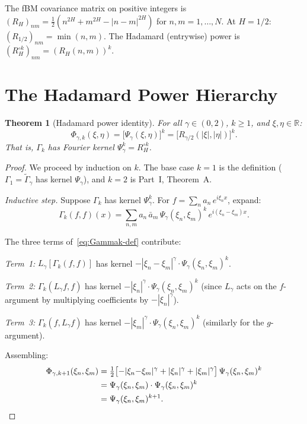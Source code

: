 \documentclass[11pt,a4paper]{article}
\theoremstyle{plain}
\newtheorem{theorem}{Theorem}[section]
\theoremstyle{definition}
\theoremstyle{remark}
\newcommand{\R}{\mathbb{R}}
\begin{document}
The fBM covariance matrix on positive integers is
$(R_H)_{nm} = \frac{1}{2}(n^{2H} + m^{2H} - |n-m|^{2H})$
for $n,m = 1,\ldots,N$.
At $H = 1/2$: $(R_{1/2})_{nm} = \min(n,m)$.
The Hadamard (entrywise) power is
$(R_H^{\circ k})_{nm} = (R_H(n,m))^k$.


\section{The Hadamard Power Hierarchy}\label{sec:hierarchy}

\begin{theorem}[Hadamard power identity]\label{thm:hierarchy}
For all $\gamma \in (0,2)$, $k \geq 1$, and $\xi,\eta \in \R$:
\begin{equation}\label{eq:Phik-formula}
  \Phi_{\gamma,k}(\xi,\eta) = \bigl[\Psi_\gamma(\xi,\eta)\bigr]^k
  = \bigl[R_{\gamma/2}(|\xi|,|\eta|)\bigr]^k.
\end{equation}
That is, $\Gamma_k$ has Fourier kernel $\Psi_\gamma^k = R_H^{\circ k}$.
\end{theorem}

\begin{proof}
We proceed by induction on $k$. The base case $k = 1$ is the
definition ($\Gamma_1 = \widetilde{\Gamma}_\gamma$ has kernel
$\Psi_\gamma$), and $k = 2$ is Part~I, Theorem~A.

\emph{Inductive step.}
Suppose $\Gamma_k$ has kernel $\Psi_\gamma^k$.
For $f = \sum_n a_n\,e^{i\xi_n x}$, expand:
\[
  \Gamma_k(f,f)(x)
  = \sum_{n,m} a_n\,\bar{a}_m\,
    \Psi_\gamma(\xi_n,\xi_m)^k\,e^{i(\xi_n - \xi_m)x}.
\]

The three terms of~\eqref{eq:Gammak-def} contribute:

\emph{Term~1:}
$L_\gamma[\Gamma_k(f,f)]$ has kernel
$-|\xi_n - \xi_m|^\gamma \cdot \Psi_\gamma(\xi_n,\xi_m)^k$.

\emph{Term~2:}
$\Gamma_k(L_\gamma f, f)$ has kernel
$-|\xi_n|^\gamma \cdot \Psi_\gamma(\xi_n,\xi_m)^k$
(since $L_\gamma$ acts on the $f$-argument by multiplying
coefficients by $-|\xi_n|^\gamma$).

\emph{Term~3:}
$\Gamma_k(f, L_\gamma f)$ has kernel
$-|\xi_m|^\gamma \cdot \Psi_\gamma(\xi_n,\xi_m)^k$
(similarly for the $g$-argument).

Assembling:
\begin{align*}
  \Phi_{\gamma,k+1}(\xi_n,\xi_m)
  &= \tfrac{1}{2}\bigl[
    -|\xi_n{-}\xi_m|^\gamma
    + |\xi_n|^\gamma + |\xi_m|^\gamma
  \bigr]\,\Psi_\gamma(\xi_n,\xi_m)^k \\
  &= \Psi_\gamma(\xi_n,\xi_m) \cdot
     \Psi_\gamma(\xi_n,\xi_m)^k \\
  &= \Psi_\gamma(\xi_n,\xi_m)^{k+1}. \qedhere
\end{align*}
\end{proof}
\end{document}
